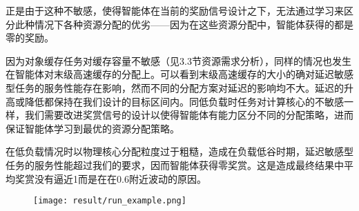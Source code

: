 正是由于这种不敏感，使得智能体在当前的奖励信号设计之下，无法通过学习来区分此种情况下各种资源分配的优劣——因为在这些资源分配中，智能体获得的都是零的奖励。

因为对象缓存任务对缓存容量不敏感（见3.3节资源需求分析），同样的情况也发生在智能体对末级高速缓存的分配上。可以看到末级高速缓存的大小的确对延迟敏感型任务的服务性能存在影响，然而不同的分配方案对延迟的影响均不大。延迟的升高或降低都保持在我们设计的目标区间内。同低负载时任务对计算核心的不敏感一样，我们需要改进奖赏信号的设计以使得智能体有能力区分不同的分配策略，进而保证智能体学习到最优的资源分配策略。

在低负载情况时以物理核心分配粒度过于粗糙，造成在负载低谷时期，延迟敏感型任务的服务性能超过我们的要求，因而智能体获得零奖赏。这是造成最终结果中平均奖赏没有逼近1而是在在0.6附近波动的原因。

\begin{figure}
  \centering
  \texttt{[image: result/run\_example.png]}
  \label{fig:actor_critic}
\end{figure}



